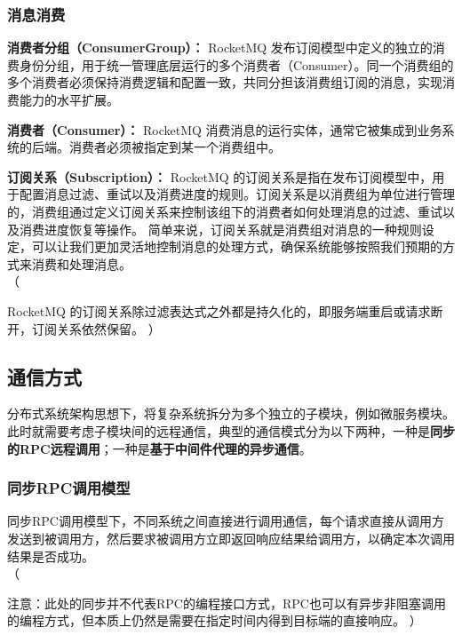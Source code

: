 \documentclass[11pt, a4paper, oneside]{ctexbook}
\let\kaishu\relax                               %
\newenvironment{ignore}{%
  \color{gray}%
  \ignorespaces%
  （%
}{%
  ）%
  \ignorespacesafterend%
}
\begin{document}
\subsubsection{消息消费}
\textbf{消费者分组（ConsumerGroup）：}
RocketMQ 发布订阅模型中定义的独立的消费身份分组，用于统一管理底层运行的多个消费者（Consumer）。同一个消费组的多个消费者必须保持消费逻辑和配置一致，共同分担该消费组订阅的消息，实现消费能力的水平扩展。

\textbf{消费者（Consumer）：}
RocketMQ 消费消息的运行实体，通常它被集成到业务系统的后端。消费者必须被指定到某一个消费组中。

\textbf{订阅关系（Subscription）：}
RocketMQ 的订阅关系是指在发布订阅模型中，用于配置消息过滤、重试以及消费进度的规则。订阅关系是以消费组为单位进行管理的，消费组通过定义订阅关系来控制该组下的消费者如何处理消息的过滤、重试以及消费进度恢复等操作。
简单来说，订阅关系就是消费组对消息的一种规则设定，可以让我们更加灵活地控制消息的处理方式，确保系统能够按照我们预期的方式来消费和处理消息。\\
\begin{ignore}
  RocketMQ 的订阅关系除过滤表达式之外都是持久化的，即服务端重启或请求断开，订阅关系依然保留。
\end{ignore}

\subsection{通信方式}
分布式系统架构思想下，将复杂系统拆分为多个独立的子模块，例如微服务模块。此时就需要考虑子模块间的远程通信，典型的通信模式分为以下两种，一种是{\bfseries\kaishu 同步的RPC远程调用}；一种是{\bfseries\kaishu 基于中间件代理的异步通信}。

\subsubsection{同步RPC调用模型}
同步RPC调用模型下，不同系统之间直接进行调用通信，每个请求直接从调用方发送到被调用方，然后要求被调用方立即返回响应结果给调用方，以确定本次调用结果是否成功。\\
\begin{ignore}
  注意：此处的同步并不代表RPC的编程接口方式，RPC也可以有异步非阻塞调用的编程方式，但本质上仍然是需要在指定时间内得到目标端的直接响应。
\end{ignore}
\end{document}
